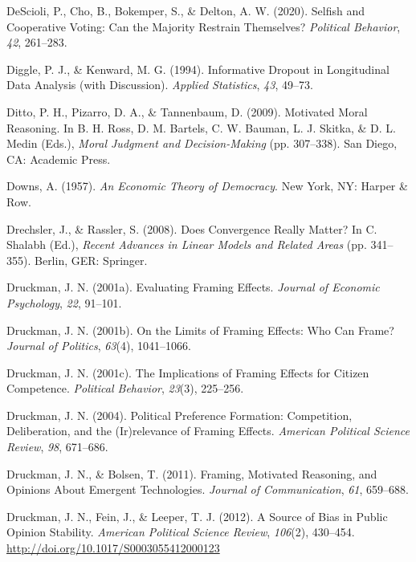 \documentclass[12pt,econ]{sources/authesis}
\begin{document}
\leavevmode\hypertarget{ref-descioli_2020_selfish}{}%
DeScioli, P., Cho, B., Bokemper, S., \& Delton, A. W. (2020). Selfish and Cooperative Voting: Can the Majority Restrain Themselves? \emph{Political Behavior}, \emph{42}, 261--283.

\leavevmode\hypertarget{ref-diggle_1994_informative}{}%
Diggle, P. J., \& Kenward, M. G. (1994). Informative Dropout in Longitudinal Data Analysis (with Discussion). \emph{Applied Statistics}, \emph{43}, 49--73.

\leavevmode\hypertarget{ref-ditto_motivated_2009}{}%
Ditto, P. H., Pizarro, D. A., \& Tannenbaum, D. (2009). Motivated Moral Reasoning. In B. H. Ross, D. M. Bartels, C. W. Bauman, L. J. Skitka, \& D. L. Medin (Eds.), \emph{Moral Judgment and Decision-Making} (pp. 307--338). San Diego, CA: Academic Press.

\leavevmode\hypertarget{ref-downs_economic_1957}{}%
Downs, A. (1957). \emph{An Economic Theory of Democracy}. New York, NY: Harper \& Row.

\leavevmode\hypertarget{ref-drechsler_2008_does}{}%
Drechsler, J., \& Rassler, S. (2008). Does Convergence Really Matter? In C. Shalabh (Ed.), \emph{Recent Advances in Linear Models and Related Areas} (pp. 341--355). Berlin, GER: Springer.

\leavevmode\hypertarget{ref-druckman_evaluating_2001}{}%
Druckman, J. N. (2001a). Evaluating Framing Effects. \emph{Journal of Economic Psychology}, \emph{22}, 91--101.

\leavevmode\hypertarget{ref-druckman_limits_2001}{}%
Druckman, J. N. (2001b). On the Limits of Framing Effects: Who Can Frame? \emph{Journal of Politics}, \emph{63}(4), 1041--1066.

\leavevmode\hypertarget{ref-druckman_implications_2001}{}%
Druckman, J. N. (2001c). The Implications of Framing Effects for Citizen Competence. \emph{Political Behavior}, \emph{23}(3), 225--256.

\leavevmode\hypertarget{ref-druckman_2004_political}{}%
Druckman, J. N. (2004). Political Preference Formation: Competition, Deliberation, and the (Ir)relevance of Framing Effects. \emph{American Political Science Review}, \emph{98}, 671--686.

\leavevmode\hypertarget{ref-druckman_framing_2011}{}%
Druckman, J. N., \& Bolsen, T. (2011). Framing, Motivated Reasoning, and Opinions About Emergent Technologies. \emph{Journal of Communication}, \emph{61}, 659--688.

\leavevmode\hypertarget{ref-druckman_source_2012}{}%
Druckman, J. N., Fein, J., \& Leeper, T. J. (2012). A Source of Bias in Public Opinion Stability. \emph{American Political Science Review}, \emph{106}(2), 430--454. \url{http://doi.org/10.1017/S0003055412000123}
\end{document}
